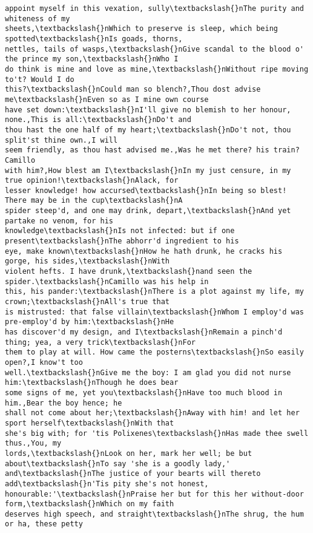 \documentclass[11pt]{article}
\begin{document}
\begin{tcolorbox}[breakable, size=fbox, boxrule=.5pt, pad at break*=1mm, opacityfill=0]
\begin{Verbatim}[commandchars=\\\{\}]
appoint myself in this vexation, sully\textbackslash{}nThe purity and whiteness of my
sheets,\textbackslash{}nWhich to preserve is sleep, which being spotted\textbackslash{}nIs goads, thorns,
nettles, tails of wasps,\textbackslash{}nGive scandal to the blood o' the prince my son,\textbackslash{}nWho I
do think is mine and love as mine,\textbackslash{}nWithout ripe moving to't? Would I do
this?\textbackslash{}nCould man so blench?,Thou dost advise me\textbackslash{}nEven so as I mine own course
have set down:\textbackslash{}nI'll give no blemish to her honour, none.,This is all:\textbackslash{}nDo't and
thou hast the one half of my heart;\textbackslash{}nDo't not, thou split'st thine own.,I will
seem friendly, as thou hast advised me.,Was he met there? his train? Camillo
with him?,How blest am I\textbackslash{}nIn my just censure, in my true opinion!\textbackslash{}nAlack, for
lesser knowledge! how accursed\textbackslash{}nIn being so blest! There may be in the cup\textbackslash{}nA
spider steep'd, and one may drink, depart,\textbackslash{}nAnd yet partake no venom, for his
knowledge\textbackslash{}nIs not infected: but if one present\textbackslash{}nThe abhorr'd ingredient to his
eye, make known\textbackslash{}nHow he hath drunk, he cracks his gorge, his sides,\textbackslash{}nWith
violent hefts. I have drunk,\textbackslash{}nand seen the spider.\textbackslash{}nCamillo was his help in
this, his pander:\textbackslash{}nThere is a plot against my life, my crown;\textbackslash{}nAll's true that
is mistrusted: that false villain\textbackslash{}nWhom I employ'd was pre-employ'd by him:\textbackslash{}nHe
has discover'd my design, and I\textbackslash{}nRemain a pinch'd thing; yea, a very trick\textbackslash{}nFor
them to play at will. How came the posterns\textbackslash{}nSo easily open?,I know't too
well.\textbackslash{}nGive me the boy: I am glad you did not nurse him:\textbackslash{}nThough he does bear
some signs of me, yet you\textbackslash{}nHave too much blood in him.,Bear the boy hence; he
shall not come about her;\textbackslash{}nAway with him! and let her sport herself\textbackslash{}nWith that
she's big with; for 'tis Polixenes\textbackslash{}nHas made thee swell thus.,You, my
lords,\textbackslash{}nLook on her, mark her well; be but about\textbackslash{}nTo say 'she is a goodly lady,'
and\textbackslash{}nThe justice of your bearts will thereto add\textbackslash{}n'Tis pity she's not honest,
honourable:'\textbackslash{}nPraise her but for this her without-door form,\textbackslash{}nWhich on my faith
deserves high speech, and straight\textbackslash{}nThe shrug, the hum or ha, these petty

\end{Verbatim}
\end{tcolorbox}
\end{document}
